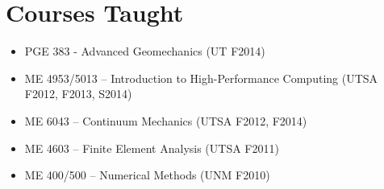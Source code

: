 \section*{Courses Taught}

  \begin{itemize}
      \item PGE 383 - Advanced Geomechanics (UT F2014)
      \item ME 4953/5013 -- Introduction to High-Performance Computing (UTSA F2012, F2013, S2014)
      \item ME 6043 -- Continuum Mechanics (UTSA F2012, F2014)
      \item ME 4603 -- Finite Element Analysis (UTSA F2011)
      \item ME 400/500 -- Numerical Methods (UNM F2010)
  \end{itemize}

